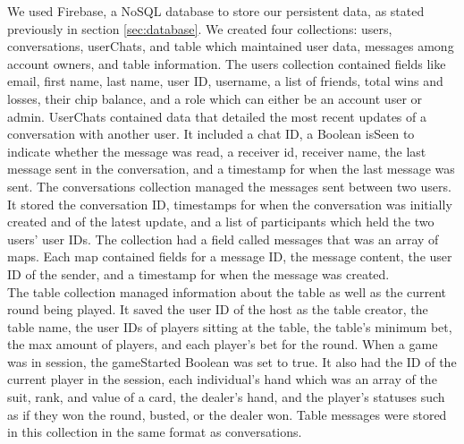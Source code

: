 We used Firebase, a NoSQL database to store our persistent data, as stated previously in section \ref{sec:database}. We created four collections: users, conversations, userChats, and table which maintained user data, messages among account owners, and table information. The users collection contained fields like email, first name, last name, user ID, username, a list of friends, total wins and losses, their chip balance, and a role which can either be an account user or admin. UserChats contained data that detailed the most recent updates of a conversation with another user. It included a chat ID, a Boolean isSeen to indicate whether the message was read, a receiver id, receiver name, the last message sent in the conversation, and a timestamp for when the last message was sent. The conversations collection managed the messages sent between two users. It stored the conversation ID, timestamps for when the conversation was initially created and of the latest update, and a list of participants which held the two users’ user IDs. The collection had a field called messages that was an array of maps. Each map contained fields for a message ID, the message content, the user ID of the sender, and a timestamp for when the message was created. \\

\noindent The table collection managed information about the table as well as the current round being played. It saved the user ID of the host as the table creator, the table name, the user IDs of players sitting at the table, the table’s minimum bet, the max amount of players, and each player’s bet for the round. When a game was in session, the gameStarted Boolean was set to true. It also had the ID of the current player in the session, each individual’s hand which was an array of the suit, rank, and value of a card, the dealer’s hand, and the player’s statuses such as if they won the round, busted, or the dealer won. Table messages were stored in this collection in the same format as conversations.

 \clearpage

